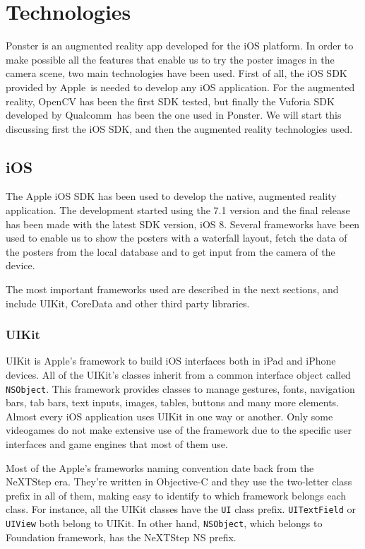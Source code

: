 \chapter{Technologies}
Ponster is an augmented reality app developed for the iOS platform. In order to make
possible all the features that enable us to try the poster images in the camera
scene, two main technologies have been used. First of all, the iOS SDK provided by
Apple\textregistered ~is needed to develop any iOS application. For the augmented reality, OpenCV
has been the first SDK tested, but finally the Vuforia SDK\cite{vuforia} developed
by Qualcomm\textregistered ~has been the one used in Ponster. We will start this
discussing first the iOS SDK, and then the augmented reality technologies used.

\section{iOS}
The Apple iOS SDK has been used to develop the native, augmented reality
application. The development started using the 7.1 version and the final release has
been made with the latest SDK version, iOS 8. Several frameworks have been used to
enable us to show the posters with a waterfall layout, fetch the data of the posters
from the local database and to get input from the camera of the device.

The most important frameworks used are described in the next sections, and include
UIKit, CoreData and other third party libraries.

\subsection{UIKit}
UIKit\cite{uikit} is Apple's framework to build iOS interfaces both in iPad and
iPhone devices. All of the UIKit's classes inherit from a common interface object
called \texttt{NSObject}. This framework provides classes to manage gestures, fonts,
navigation bars, tab bars, text inputs, images, tables, buttons and many more
elements. Almost every iOS application uses UIKit in one way or another. Only some
videogames do not make extensive use of the framework due to the specific user
interfaces and game engines that most of them use. 

Most of the Apple's frameworks naming convention date back from the NeXTStep era. They're written in
Objective-C and they use the two-letter class prefix in all of them, making easy to
identify to which framework belongs each class. For instance, all the UIKit classes
have the \texttt{UI} class prefix. \texttt{UITextField} or \texttt{UIView} both
belong to UIKit. In other hand, \texttt{NSObject}, which belongs to Foundation
framework, has the NeXTStep NS prefix.

